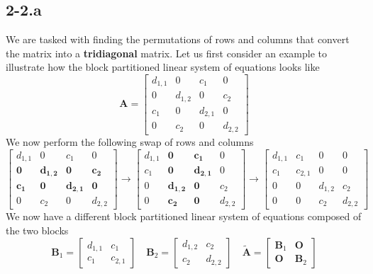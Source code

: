\documentclass{article}
\begin{document}
\subsection*{2-2.a}
We are tasked with finding the permutations of rows and columns that convert the matrix into a \textbf{tridiagonal} matrix. Let us first consider an example to illustrate how the block partitioned linear system of equations looks like
\begin{equation*}
\mathbf{A} = 
    \begin{bmatrix}
        d_{1,1}  & 0 & c_{1}  & 0 \\
        0 & d_{1,2}  & 0 & c_{2}  \\
        c_{1} & 0 & d_{2,1} & 0 \\
        0 & c_{2}  & 0 & d_{2,2}  
    \end{bmatrix}
\end{equation*}
We now perform the following swap of rows and columns
\begin{equation*}
    \begin{bmatrix}
        d_{1,1}  & 0 & c_{1}  & 0 \\
        \mathbf{0} & \mathbf{d_{1,2}}  & \mathbf{0} & \mathbf{c_{2}}  \\
        \mathbf{c_{1}} & \mathbf{0} & \mathbf{d_{2,1}} & \mathbf{0} \\
        0 & c_{2}  & 0 & d_{2,2}  
    \end{bmatrix} \longrightarrow
    \begin{bmatrix}
        d_{1,1}  & \mathbf{0} & \mathbf{c_{1}}  & 0 \\
        c_{1} & \mathbf{0} & \mathbf{d_{2,1}} & 0 \\
                0 & \mathbf{d_{1,2}}  & \mathbf{0} & c_{2}  \\
        0 & \mathbf{c_{2}}  & \mathbf{0} & d_{2,2}  
    \end{bmatrix}  \longrightarrow 
    \begin{bmatrix}
        d_{1,1} & c_{1} & 0 & 0 \\
        c_{1} & c_{2,1} & 0 & 0 \\
        0 & 0 & d_{1,2} & c_{2} \\
        0 & 0 & c_{2} & d_{2,2}
    \end{bmatrix}
\end{equation*}
We now have a different block partitioned linear system of equations composed of the two blocks
\begin{equation*}
    \mathbf{B}_{1} = \begin{bmatrix}
        d_{1,1} & c_{1} \\
        c_{1} & c_{2,1} 
    \end{bmatrix} \quad \mathbf{B}_{2} = \begin{bmatrix}
        d_{1,2} & c_{2} \\
        c_{2} & d_{2,2}
    \end{bmatrix} \quad \tilde{\mathbf{A}} = \begin{bmatrix}
        \mathbf{B}_{1} & \mathbf{O} \\
        \mathbf{O} & \mathbf{B}_{2}
    \end{bmatrix}
\end{equation*}
\end{document}
